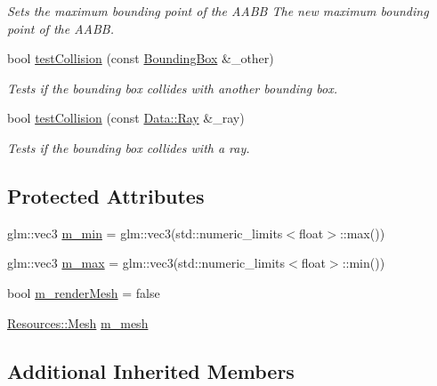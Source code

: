 \begin{DoxyCompactItemize}
\begin{DoxyCompactList}\small\item\em Sets the maximum bounding point of the A\+A\+BB  The new maximum bounding point of the A\+A\+BB. \end{DoxyCompactList}\item 
bool \hyperlink{class_cookie_eng_1_1_components_1_1_bounding_box_aa121d65a4271d524fefb153f7388421a}{test\+Collision} (const \hyperlink{class_cookie_eng_1_1_components_1_1_bounding_box}{Bounding\+Box} \&\+\_\+other)
\begin{DoxyCompactList}\small\item\em Tests if the bounding box collides with another bounding box. \end{DoxyCompactList}\item 
bool \hyperlink{class_cookie_eng_1_1_components_1_1_bounding_box_aebb0d8b30c7d24d9617b391434205769}{test\+Collision} (const \hyperlink{struct_cookie_eng_1_1_data_1_1_ray}{Data\+::\+Ray} \&\+\_\+ray)
\begin{DoxyCompactList}\small\item\em Tests if the bounding box collides with a ray. \end{DoxyCompactList}\end{DoxyCompactItemize}
\subsection*{Protected Attributes}
\begin{DoxyCompactItemize}
\item 
glm\+::vec3 \hyperlink{class_cookie_eng_1_1_components_1_1_bounding_box_ac09de9910abef58938d4c692c6a64855}{m\+\_\+min} = glm\+::vec3(std\+::numeric\+\_\+limits$<$float$>$\+::max())
\item 
glm\+::vec3 \hyperlink{class_cookie_eng_1_1_components_1_1_bounding_box_a2075e00805e700e3b24abe83dd26008c}{m\+\_\+max} = glm\+::vec3(std\+::numeric\+\_\+limits$<$float$>$\+::min())
\item 
bool \hyperlink{class_cookie_eng_1_1_components_1_1_bounding_box_a0378442f8184a6729d44c14a0be2f727}{m\+\_\+render\+Mesh} = false
\item 
\hyperlink{struct_cookie_eng_1_1_resources_1_1_mesh}{Resources\+::\+Mesh} \hyperlink{class_cookie_eng_1_1_components_1_1_bounding_box_a68294bec52783787ea0d91abfab773a7}{m\+\_\+mesh}
\end{DoxyCompactItemize}
\subsection*{Additional Inherited Members}


